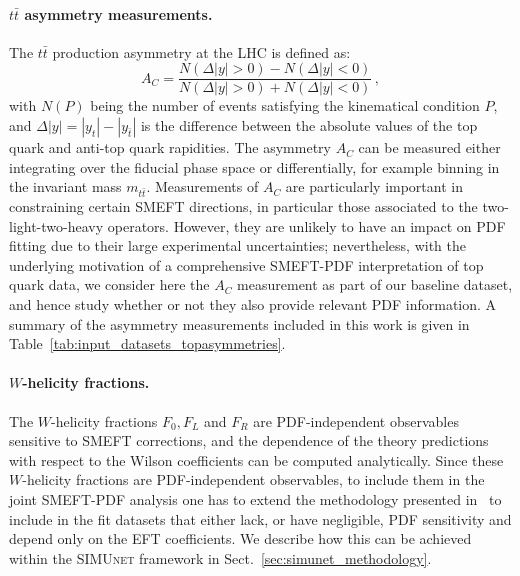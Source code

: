 \documentclass[withindex,glossary]{cam-thesis}
\newcommand{\simunet}{\textsc{SIMUnet}}
\begin{document}
 \paragraph{$t\bar{t}$ asymmetry measurements.} The $t\bar{t}$ production asymmetry
 at the LHC is defined as:
 \begin{equation}
   \label{eq:ac}
A_C = \frac{N(\Delta |y| > 0) - N(\Delta |y| < 0)}{N(\Delta |y| > 0) + N(\Delta |y| < 0)} \, ,
\end{equation}
with $N(P)$ being the number of events satisfying the kinematical condition $P$, and $\Delta |y| = |y_t| - |y_{\bar{t}}|$ is the difference between the absolute values of the top quark and anti-top quark rapidities.
%
The asymmetry $A_C$ can be measured either integrating over the fiducial phase space
or differentially, for example binning in the invariant mass $m_{t\bar{t}}$.
%
Measurements of $A_C$ are particularly important in constraining certain SMEFT directions,
in particular those associated to the two-light-two-heavy operators.
%
However, they are unlikely to have an impact on PDF fitting due to their large
experimental uncertainties; nevertheless, with the underlying 
motivation of a comprehensive SMEFT-PDF interpretation
of top quark data, we consider here the $A_C$ measurement as part of our baseline dataset,
and hence study whether or not they also provide relevant PDF information. 
% 
A summary of the asymmetry measurements included in this work is given in Table~\ref{tab:input_datasets_topasymmetries}.





\paragraph{$W$-helicity fractions.}
%
The $W$-helicity fractions $F_0, F_L$ and $F_R$ are PDF-independent observables
sensitive to SMEFT corrections, and the dependence of the theory predictions
with respect to the Wilson coefficients can be computed
analytically.
%
Since these $W$-helicity fractions are PDF-independent observables, to include them
in the joint SMEFT-PDF analysis one has to extend the methodology presented in~\cite{Iranipour:2022iak}
to include in the fit datasets that either lack, or have negligible, PDF sensitivity
and depend only on the EFT coefficients.
%
We describe how this can be achieved within the \simunet{} framework
in Sect.~\ref{sec:simunet_methodology}. 
\end{document}
